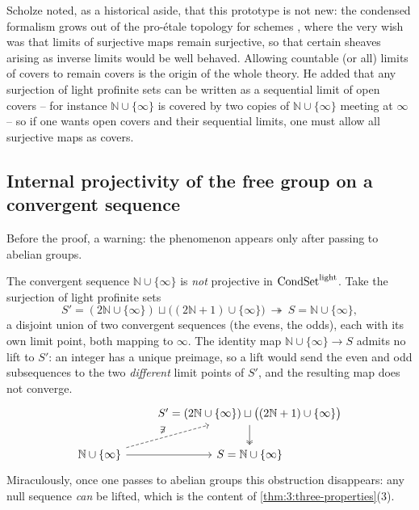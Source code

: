 \begin{remark}
\label{rmk:3:proetale-origin}
Scholze noted, as a historical aside, that this prototype is not new: the
condensed formalism grows out of the pro-\'etale topology for schemes
\cite{bhatt2014proetaletopologyschemes}, where the very wish was that limits of
surjective maps remain surjective, so that certain sheaves arising as inverse
limits would be well behaved. Allowing countable (or all) limits of covers to
remain covers is the origin of the whole theory. He added that any surjection of
light profinite sets can be written as a sequential limit of open covers -- for
instance $\mathbb{N}\cup\{\infty\}$ is covered by two copies of
$\mathbb{N}\cup\{\infty\}$ meeting at $\infty$ -- so if one wants open covers
and their sequential limits, one must allow all surjective maps as covers.
\end{remark}

\subsection{Internal projectivity of the free group on a convergent sequence}

Before the proof, a warning: the phenomenon appears only after passing to
abelian groups.

\begin{remark}
\label{rmk:3:seq-not-projective}
The convergent sequence $\mathbb{N}\cup\{\infty\}$ is \emph{not} projective in
$\mathrm{CondSet}^{\mathrm{light}}$. Take the surjection of light profinite sets
\begin{equation*}
S'=(2\mathbb{N}\cup\{\infty\})\sqcup\bigl((2\mathbb{N}+1)\cup\{\infty\}\bigr)
\ \twoheadrightarrow\ S=\mathbb{N}\cup\{\infty\},
\end{equation*}
a disjoint union of two convergent sequences (the evens, the odds), each with its
own limit point, both mapping to $\infty$. The identity map
$\mathbb{N}\cup\{\infty\}\to S$ admits no lift to $S'$: an integer has a unique
preimage, so a lift would send the even and odd subsequences to the two
\emph{different} limit points of $S'$, and the resulting map does not converge.
\[
\begin{tikzcd}
& S'=(2\mathbb{N}\cup\{\infty\})\sqcup\bigl((2\mathbb{N}+1)\cup\{\infty\}\bigr) \arrow[d, two heads] \\
\mathbb{N}\cup\{\infty\} \arrow[r] \arrow[ur, dashed, "\not\exists"] & S=\mathbb{N}\cup\{\infty\}
\end{tikzcd}
\]
Miraculously, once one passes to abelian groups this obstruction disappears: any
null sequence \emph{can} be lifted, which is the content of
\cref{thm:3:three-properties}(3).
\end{remark}

